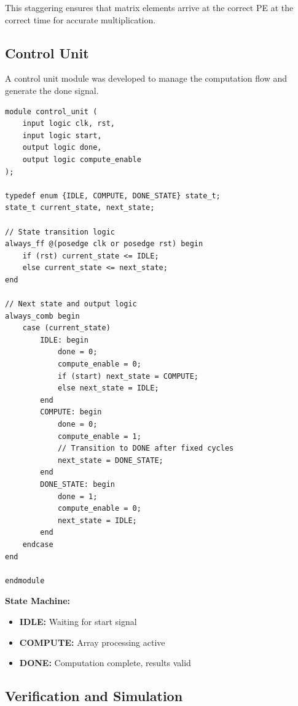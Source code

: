 \documentclass[12pt,a4paper]{article}
\begin{document}
This staggering ensures that matrix elements arrive at the correct PE at the correct time for accurate multiplication.




\newpage

\subsection{Control Unit}

A control unit module was developed to manage the computation flow and generate the done signal.

\begin{lstlisting}[style=verilog,caption={Control Unit FSM (Conceptual)},label={lst:control}]
module control_unit (
    input logic clk, rst,
    input logic start,
    output logic done,
    output logic compute_enable
);

typedef enum {IDLE, COMPUTE, DONE_STATE} state_t;
state_t current_state, next_state;

// State transition logic
always_ff @(posedge clk or posedge rst) begin
    if (rst) current_state <= IDLE;
    else current_state <= next_state;
end

// Next state and output logic
always_comb begin
    case (current_state)
        IDLE: begin
            done = 0;
            compute_enable = 0;
            if (start) next_state = COMPUTE;
            else next_state = IDLE;
        end
        COMPUTE: begin
            done = 0;
            compute_enable = 1;
            // Transition to DONE after fixed cycles
            next_state = DONE_STATE;
        end
        DONE_STATE: begin
            done = 1;
            compute_enable = 0;
            next_state = IDLE;
        end
    endcase
end

endmodule
\end{lstlisting}
\newpage

\textbf{State Machine:}
\begin{itemize}
    \item \textbf{IDLE:} Waiting for start signal
    \item \textbf{COMPUTE:} Array processing active
    \item \textbf{DONE:} Computation complete, results valid
\end{itemize}
\subsection{Verification and Simulation}
\end{document}
